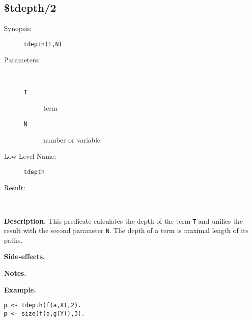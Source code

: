 %
%
%
\subsection{\$tdepth/2}

\begin{description}
\item[Synopsis:]
	{\tt tdepth(T,N)}
\item[Parameters:]\ \\[-0.5cm]
	\begin{description}
	\item[{\tt T}] term
	\item[{\tt N}] number or variable
	\end{description}
\item[Low Level Name:]
	{\tt tdepth}
\item[Result:]\ \\
\end{description}

\vspace*{0.5cm}
\noindent
{\bf Description.}
This predicate calculates the depth of the term {\tt T} and
unifies the result with the second parameter {\tt N}.
The depth of a term is maximal length of its paths.

\vspace*{0.5cm}
\noindent
{\bf Side-effects.}

\vspace*{0.5cm}
\noindent
{\bf Notes.}

\vspace*{0.5cm}
\noindent
{\bf Example.}
\begin{verbatim}
p <- tdepth(f(a,X),2).
p <- size(f(a,g(Y)),3).
\end{verbatim}



